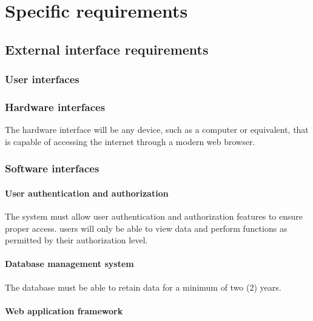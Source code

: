 \documentclass[letterpaper,article,oneside]{memoir}
\begin{document}
\chapter{Specific requirements}

\section{External interface requirements}

\subsection{User interfaces}


\subsection{Hardware interfaces}

The hardware interface will be any device, such as a computer or equivalent, that is capable of accessing the internet through a modern web browser.

\subsection{Software interfaces}

\subsubsection{User authentication and authorization}

The system must allow user authentication and authorization features to ensure proper access.
\Glspl{user} will only be able to view data and perform functions as permitted by their authorization level.

\subsubsection{Database management system}

 The database must be able to retain data for a minimum of two (2) years.

\subsubsection{Web application framework}
\end{document}
